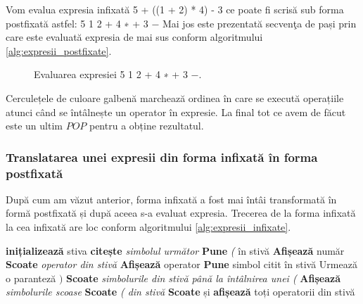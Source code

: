 Vom evalua expresia infixată 5 + ((1 + 2) * 4) - 3 ce poate fi scrisă sub forma
postfixată astfel:
 5 1 2 + 4 ∗ + 3 −
Mai jos este prezentată secvenţa de pași prin care este evaluată expresia de mai sus conform algoritmului \ref{alg:expresii_postfixate}.

\begin{figure}[H] 
	\centering	
	{
	}
	\caption{Evaluarea expresiei  5 1 2 + 4 ∗ + 3 −.} 
	\label{fig:stackpostfix}
\end{figure}

Cerculețele de culoare galbenă marchează ordinea în care se execută operațiile atunci când se întâlnește un operator în expresie. 
La final tot ce avem de făcut este un ultim $POP$ pentru a obține rezultatul.

\subsubsection{Translatarea unei expresii din forma infixată în forma postfixată}

După cum am văzut anterior, forma infixată a fost mai întâi transformată în formă postfixată și după aceea s-a evaluat expresia. Trecerea de la forma infixată la cea infixată are loc conform algoritmului \ref{alg:expresii_infixate}.

\begin{algorithm} [H]
	\caption{}\label{alg:expresii_infixate}
	\begin{algorithmic}[1]
		\State \textbf{inițializează} stiva
		\State \textbf{citește} \textit{simbolul următor}	
		\State \textbf{Pune} \textit{(}	în stivă
		\Else 
			\State \textbf{Afișează} număr
			\Else 
				\State \textbf{Scoate} \textit{operator din stivă}
				\State \textbf{Afișează} operator				
				\EndIf		
				\State \textbf{Pune} simbol citit în stivă
				\Else \Comment Urmează o paranteză $)$
					\State \textbf{Scoate} \textit{simbolurile din stivă până la întâlnirea unei (}
					\State \textbf{Afișează} \textit{simbolurile scoase}
					\State \textbf{Scoate} \textit{( din stivă}
				\EndIf	
			\EndIf			
		\EndIf		
		\EndWhile
		\State \textbf{Scoate} și \textbf{afișează}	toți operatorii din stivă
	\end{algorithmic}
\end{algorithm}